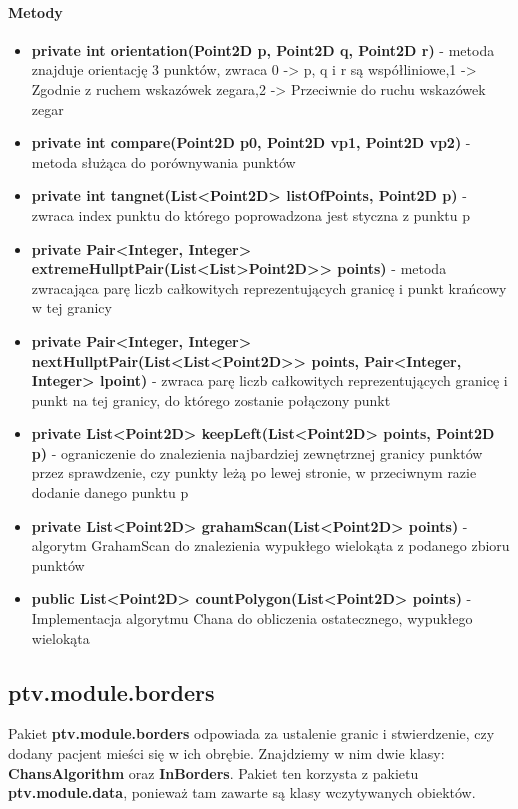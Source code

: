 \documentclass[]{article}
\begin{document}
                \paragraph{Metody}
                    \begin{itemize}
                        \item \textbf{private int orientation(Point2D p, Point2D q, Point2D r)} - metoda znajduje orientację 3 punktów, zwraca 0 -> p, q i r są współliniowe,1 -> Zgodnie z ruchem wskazówek zegara,2 -> Przeciwnie do ruchu wskazówek zegar
                        \item\textbf{ private int compare(Point2D p0, Point2D vp1, Point2D vp2)} - metoda służąca do porównywania punktów
                        \item \textbf{private int tangnet(List<Point2D> listOfPoints, Point2D p)} - zwraca index punktu do którego poprowadzona jest styczna z punktu p
                        \item \textbf{private Pair<Integer, Integer> extremeHullptPair(List<List>Point2D>{}> points)} - metoda zwracająca parę liczb całkowitych reprezentujących granicę i punkt krańcowy w tej granicy
                        \item \textbf{private Pair<Integer, Integer> nextHullptPair(List<List<Point2D>{}> points, Pair<Integer, Integer> lpoint)} - zwraca parę liczb całkowitych reprezentujących granicę i punkt na tej granicy, do którego zostanie połączony punkt
                        \item \textbf{private List<Point2D> keepLeft(List<Point2D> points, Point2D p)} - ograniczenie do znalezienia najbardziej zewnętrznej granicy punktów przez sprawdzenie, czy punkty leżą po lewej stronie, w przeciwnym razie dodanie danego punktu p
                        \item \textbf{private List<Point2D> grahamScan(List<Point2D> points)} - algorytm GrahamScan do znalezienia wypukłego wielokąta z podanego zbioru punktów
                        \item \textbf{public List<Point2D> countPolygon(List<Point2D> points)} - Implementacja algorytmu Chana do obliczenia ostatecznego, wypukłego wielokąta
                    \end{itemize}
        
        \subsection{ptv.module.borders} %
            Pakiet \textbf{ptv.module.borders} odpowiada za ustalenie granic i stwierdzenie, czy dodany pacjent mieści się w ich obrębie. Znajdziemy w nim dwie klasy: \textbf{ChansAlgorithm} oraz \textbf{InBorders}.
            Pakiet ten korzysta z pakietu \textbf{ptv.module.data}, ponieważ tam zawarte są klasy wczytywanych obiektów.
            
\end{document}
